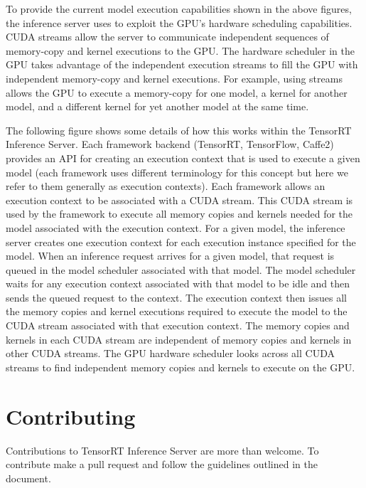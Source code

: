\documentclass[letterpaper,10pt,english]{sphinxmanual}
\let\sphinxpxdimen\pdfpxdimen\else\newdimen\sphinxpxdimen
\begin{document}
To provide the current model execution capabilities shown in the above
figures, the inference server uses 
to exploit the GPU’s hardware scheduling capabilities. CUDA streams
allow the server to communicate independent sequences of memory-copy
and kernel executions to the GPU. The hardware scheduler in the GPU
takes advantage of the independent execution streams to fill the GPU
with independent memory-copy and kernel executions. For example, using
streams allows the GPU to execute a memory-copy for one model, a
kernel for another model, and a different kernel for yet another model
at the same time.

The following figure shows some details of how this works within the
TensorRT Inference Server. Each framework backend (TensorRT,
TensorFlow, Caffe2) provides an API for creating an execution context
that is used to execute a given model (each framework uses different
terminology for this concept but here we refer to them generally as
execution contexts). Each framework allows an execution context to be
associated with a CUDA stream. This CUDA stream is used by the
framework to execute all memory copies and kernels needed for the
model associated with the execution context. For a given model, the
inference server creates one execution context for each execution
instance specified for the model. When an inference request arrives
for a given model, that request is queued in the model scheduler
associated with that model. The model scheduler waits for any
execution context associated with that model to be idle and then sends
the queued request to the context. The execution context then issues
all the memory copies and kernel executions required to execute the
model to the CUDA stream associated with that execution context. The
memory copies and kernels in each CUDA stream are independent of
memory copies and kernels in other CUDA streams. The GPU hardware
scheduler looks across all CUDA streams to find independent memory
copies and kernels to execute on the GPU.

\noindent\sphinxincludegraphics[width=657\sphinxpxdimen,height=226\sphinxpxdimen]{{cuda_stream_exec}.png}


\chapter{Contributing}
\label{\detokenize{contribute:contributing}}\label{\detokenize{contribute::doc}}
Contributions to TensorRT Inference Server are more than welcome. To
contribute make a pull request and follow the guidelines outlined in
the 
document.
\end{document}
